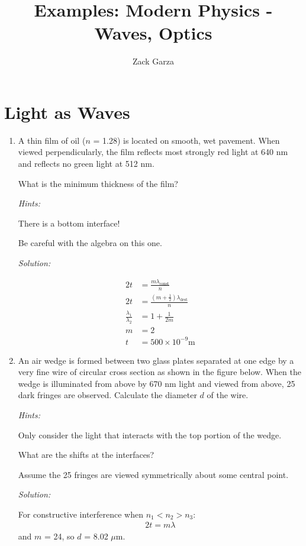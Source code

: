 \documentclass[a4paper,10pt]{report}
\begin{document}
\title{Examples: Modern Physics - Waves, Optics}
\author{Zack Garza}
\maketitle
\tableofcontents

\chapter{Light as Waves}
\begin{enumerate}
	\item
		A thin film of oil ($n$ = 1.28) is located on smooth, wet pavement. When viewed perpendicularly, the film reflects most strongly red light at 640 nm and reflects no green light at 512 nm.

		What is the minimum thickness of the film?

		\textit{Hints:}

		There is a bottom interface!

		Be careful with the algebra on this one.

		\hrulefill

		\textit{Solution:}

		\begin{align*}
			2t &= \frac{m\lambda_{\text{const}}}{n} \\
			2t &= \frac{(m+\frac{1}{2})\lambda_{\text{dest}}}{n} \\
			\frac{\lambda_1}{\lambda_2} &= 1 + \frac{1}{2m} \\
			m &= 2 \\
			t &= 500 \times 10^{-9} \text{m}
		\end{align*}

		\hrulefill

	\item
		An air wedge is formed between two glass plates separated at one edge by a very fine wire of circular cross section as shown in the figure below. When the wedge is illuminated from above by 670 nm light and viewed from above, 25 dark fringes are observed. Calculate the diameter $d$ of the wire.

		\textit{Hints:}

		Only consider the light that interacts with the top portion of the wedge.

		What are the shifts at the interfaces?

		Assume the 25 fringes are viewed symmetrically about some central point.

		\textit{Solution:}

		For constructive interference when $n_1 < n_2 > n_3$:
		\begin{align*}
			2t = m\lambda
		\end{align*}
		and $m$ = 24, so $d$ = 8.02 $\mu$m.

\end{enumerate}
\end{document}
